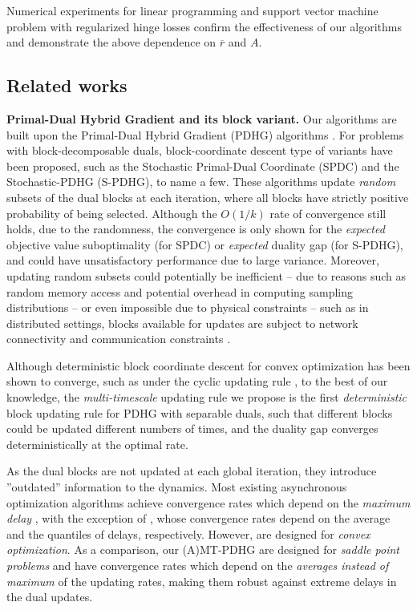 \documentclass[10pt]{article}
\begin{document}
Numerical experiments for linear programming and support vector machine problem with regularized hinge losses confirm the effectiveness of our algorithms and demonstrate the above dependence on $\overline{r}$ and $A$. 


\subsection{Related works}

\textbf{Primal-Dual Hybrid Gradient and its block variant.} Our algorithms are built upon the Primal-Dual Hybrid Gradient (PDHG) algorithms \cite{chambolle_first-order_2011,chambolle_ergodic_2016}. For problems with block-decomposable duals, block-coordinate descent type of variants have been proposed, such as the Stochastic Primal-Dual Coordinate (SPDC) \cite{pmlr-v37-zhanga15} and the Stochastic-PDHG (S-PDHG)\cite{Alacaoglu2022,Chambolle2018Stochastic}, to name a few. These algorithms update \textit{random} subsets of the dual blocks at each iteration, where all blocks have strictly positive probability of being selected. Although the $O(1/k)$ rate of convergence still holds,  due to the randomness, the convergence is only shown for the \textit{expected} objective value suboptimality (for SPDC) or \textit{expected} duality gap (for S-PDHG), and could have unsatisfactory performance due to large variance. Moreover, updating random subsets could potentially be inefficient -- due to reasons such as random memory access \cite{Sun2017} and potential overhead in computing sampling distributions \cite{Csiba2018} -- or even impossible due to physical constraints -- such as in distributed settings, blocks available for updates are subject to  network connectivity and communication constraints \cite{Angelia2015}. 




Although deterministic block coordinate descent for convex optimization has been shown to converge, such as under the cyclic updating rule \cite{Sun2017,wright_coordinate_2015}, to the best of our knowledge, the \textit{multi-timescale} updating rule we propose is the first \textit{deterministic} block updating rule for PDHG with separable duals, such that different blocks could be updated different numbers of times, and the duality gap converges deterministically at the optimal rate. 


As the dual blocks are not updated at each global iteration, they introduce ''outdated'' information to the dynamics. Most existing asynchronous optimization algorithms achieve convergence rates which depend on the \textit{maximum delay} \cite{NiuRechtReWright2011,Liu2015Asynchronous,Peng2016ARock}, with the exception of \cite{Cohen2021,Attia2025}, whose convergence rates depend on the average and the quantiles of delays, respectively. However, \cite{Cohen2021,Attia2025} are designed for \textit{convex optimization}. As a comparison, our (A)MT-PDHG are designed for \textit{saddle point problems} and have convergence rates which depend on the \textit{averages instead of maximum} of the updating rates, making them robust against extreme delays in the dual updates. 
\end{document}
